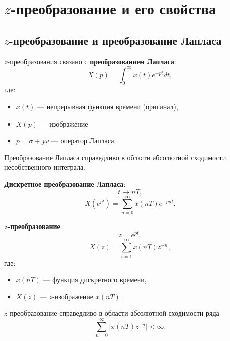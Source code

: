 \documentclass[a4paper, 14pt]{extarticle}
\begin{document}
\section{$z$-преобразование и его свойства}\label{sec:loran}
\subsection{$z$-преобразование и преобразование Лапласа}
$z$-преобразования связано с \textbf{преобразованием Лапласа}:
\begin{equation}
    X(p) = \int_0^\infty x(t) e^{-pt} dt,
\end{equation}
где:
\begin{itemize}
    \item $x(t)$ --- непрерывная функция времени (оригинал),
    \item $X(p)$ --- изображение
    \item $p = \sigma + j \omega$ --- оператор Лапласа.
\end{itemize}

Преобразование Лапласа справедливо в области абсолютной сходимости несобственного интеграла.

\textbf{Дискретное преобразование Лапласа}:
\begin{equation}
    t \to nT,
\end{equation}
\begin{equation}
    X(e^{pt}) = \sum^{\infty}_{n=0} x(nT) e^{-pnt}.
\end{equation}

\textbf{$z$-преобразование}:
\begin{equation}
    z = e^{pt},
\end{equation}
\begin{equation}
    X(z) = \sum^{\infty}_{i=1} x(nT) z^{-n},
\end{equation}
где:
\begin{itemize}
    \item $x(nT)$ --- функция дискретного времени,
    \item $X(z)$ --- $z$-изображение $x(nT)$.
\end{itemize}

$z$-преобразование справедливо в области абсолютной сходимости ряда
\begin{equation}
    \sum^{\infty}_{n=0} | x(nT) z^{-n} | < \infty.
\end{equation}
\end{document}
